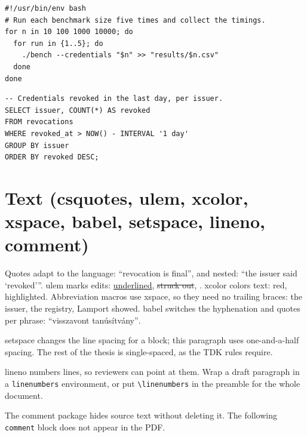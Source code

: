 \begin{listing}[!ht]
\begin{verbatim}
#!/usr/bin/env bash
# Run each benchmark size five times and collect the timings.
for n in 10 100 1000 10000; do
  for run in {1..5}; do
    ./bench --credentials "$n" >> "results/$n.csv"
  done
done
\end{verbatim}
\caption{Bash.}\label{lst:latex:bash}
\end{listing}

\begin{listing}[!ht]
\begin{verbatim}
-- Credentials revoked in the last day, per issuer.
SELECT issuer, COUNT(*) AS revoked
FROM revocations
WHERE revoked_at > NOW() - INTERVAL '1 day'
GROUP BY issuer
ORDER BY revoked DESC;
\end{verbatim}
\caption{SQL.}\label{lst:latex:sql}
\end{listing}
\FloatBarrier

\section{Text (csquotes, ulem, xcolor, xspace, babel, setspace, lineno, comment)}\label{app:latex:text}
Quotes adapt to the language: \enquote{revocation is final}, and nested: \enquote{the issuer said \enquote{revoked}}.
ulem marks edits: \uline{underlined}, \sout{struck out}, . xcolor colors text: \textcolor{red!70!black}{red}, \colorbox{yellow!40}{highlighted}.
Abbreviation macros use xspace, so they need no trailing braces: \eg the issuer, \ie the registry, Lamport \etal showed.
babel switches the hyphenation and quotes per phrase: \foreignlanguage{magyar}{\enquote{visszavont tanúsítvány}}.

\begin{onehalfspace}
setspace changes the line spacing for a block; this paragraph uses one-and-a-half spacing.
The rest of the thesis is single-spaced, as the TDK rules require.
\end{onehalfspace}

\begin{linenumbers}
lineno numbers lines, so reviewers can point at them.
Wrap a draft paragraph in a \texttt{linenumbers} environment, or put \texttt{\textbackslash linenumbers} in the preamble for the whole document.
\end{linenumbers}

The comment package hides source text without deleting it. The following \texttt{comment} block does not appear in the PDF.

